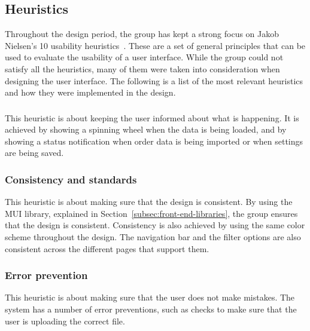 \subsection{Heuristics}\label{sec:heuristics}

Throughout the design period, the group has kept a strong focus on Jakob Nielsen's 10 usability
heuristics~\cite{usability-heuristics}.
These are a set of general principles that can be used to evaluate the usability of a user interface.
While the group could not satisfy all the heuristics, many of them were taken into consideration when designing the
user interface.
The following is a list of the most relevant heuristics and how they were implemented in the design.

\subsubsection{}\label{subsubsec:visibility-of-system-status}

This heuristic is about keeping the user informed about what is happening.
It is achieved by showing a spinning wheel when the data is being loaded, and by showing a status notification
when order data is being imported or when settings are being saved.

\subsubsection{Consistency and standards}\label{subsubsec:consistency-and-standards}

This heuristic is about making sure that the design is consistent.
By using the MUI library, explained in Section~\ref{subsec:front-end-libraries}, the group ensures that the design is
consistent.
Consistency is also achieved by using the same color scheme throughout the design.
The navigation bar and the filter options are also consistent across the different pages that support them.

\subsubsection{Error prevention}\label{subsubsec:error-prevention}

This heuristic is about making sure that the user does not make mistakes.
The system has a number of error preventions, such as checks to make sure that the user is uploading the correct file.

